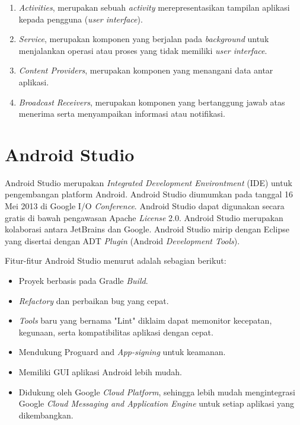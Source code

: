 \begin{enumerate}
\item \textit{Activities}, merupakan sebuah \textit{activity} merepresentasikan tampilan aplikasi kepada pengguna (\textit{user interface}).
\item \textit{Service}, merupakan komponen yang berjalan pada \textit{background} untuk menjalankan operasi atau proses yang tidak memiliki \textit{user interface}.
\item \textit{Content Providers}, merupakan komponen yang menangani data antar aplikasi.
\item \textit{Broadcast Receivers}, merupakan komponen yang bertanggung jawab atas menerima serta menyampaikan informasi atau notifikasi.
\end{enumerate}

\section{Android Studio}
Android Studio merupakan \textit{Integrated Development Environtment} (IDE) untuk pengembangan platform Android. Android Studio diumumkan pada tanggal 16 Mei 2013 di Google I/O \textit{Conference}. Android Studio dapat digunakan secara gratis di bawah pengawasan Apache \textit{License} 2.0. Android Studio merupakan kolaborasi antara JetBrains dan Google. Android Studio mirip dengan Eclipse yang disertai dengan ADT \textit{Plugin} (Android \textit{Development Tools})\citep{craig2015learn}.

\par Fitur-fitur Android Studio menurut \citep{puspitasari2020} adalah sebagian berikut:
\begin{itemize}
\item Proyek berbasis pada Gradle \textit{Build}.
\item \textit{Refactory} dan perbaikan bug yang cepat.
\item \textit{Tools} baru yang bernama "Lint" diklaim dapat memonitor kecepatan, kegunaan, serta kompatibilitas aplikasi dengan cepat.
\item Mendukung Proguard and \textit{App-signing} untuk keamanan.
\item Memiliki GUI aplikasi Android lebih mudah.
\item Didukung oleh Google \textit{Cloud Platform}, sehingga lebih mudah mengintegrasi Google \textit{Cloud Messaging and Application Engine} untuk setiap aplikasi yang dikembangkan.
\end{itemize}

